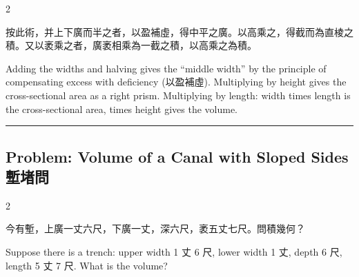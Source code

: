 \documentclass[10pt,a4paper]{article}
\newcommand{\longline}{\noindent\rule{\textwidth}{0.4pt}}
\begin{document}
\begin{paracol}{2}

\begin{leftcolumn*}
\begin{commentarybi}
按此術，并上下廣而半之者，以盈補虛，得中平之廣。以高乘之，得截而為直棱之積。又以袤乘之者，廣袤相乘為一截之積，以高乘之為積。
\end{commentarybi}
\end{leftcolumn*}

\begin{rightcolumn*}
\begin{commentarybi}
Adding the widths and halving gives the ``middle width'' by the principle of compensating excess with deficiency (以盈補虛). Multiplying by height gives the cross-sectional area as a right prism. Multiplying by length: width times length is the cross-sectional area, times height gives the volume.
\end{commentarybi}
\end{rightcolumn*}

\end{paracol}

\vspace{0.3cm}
\longline
\vspace{0.3cm}

\subsection{Problem: Volume of a Canal with Sloped Sides 塹堵問}

\begin{paracol}{2}

\begin{leftcolumn*}
\begin{problembi}[\textbf{問} · 塹堵]
今有塹，上廣一丈六尺，下廣一丈，深六尺，袤五丈七尺。問積幾何？
\end{problembi}
\end{leftcolumn*}

\begin{rightcolumn*}
\begin{problembi}
Suppose there is a trench: upper width 1 丈 6 尺, lower width 1 丈, depth 6 尺, length 5 丈 7 尺. What is the volume?
\end{problembi}
\end{rightcolumn*}

\end{paracol}
\end{document}
